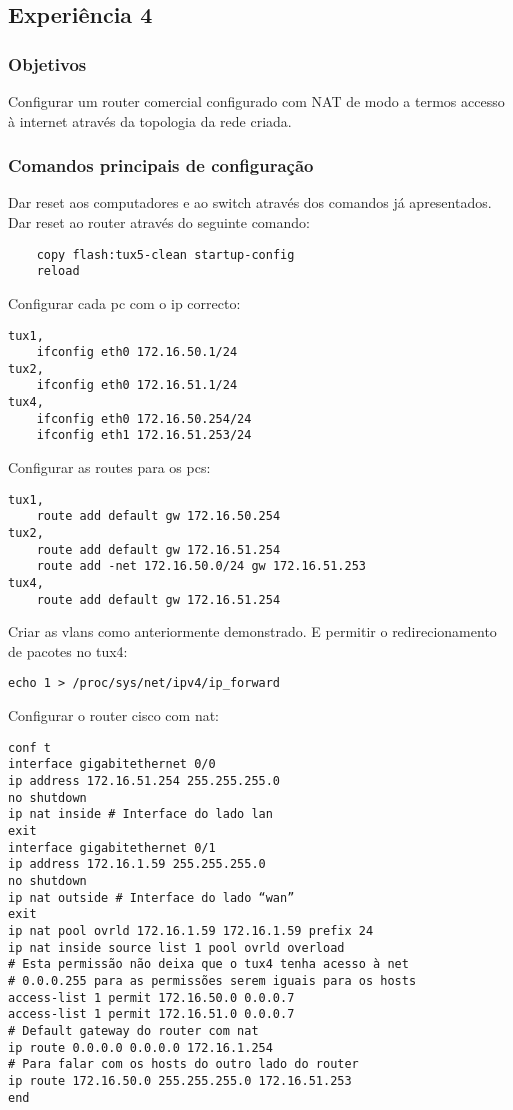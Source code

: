 \documentclass[a4paper]{article}
\begin{document}
\subsection{Experiência 4}

\subsubsection{Objetivos}
Configurar um router comercial configurado com NAT de modo a termos accesso à
internet através da topologia da rede criada.

\subsubsection{Comandos principais de configuração}

Dar reset aos computadores e ao switch através dos comandos já apresentados.\\

Dar reset ao router através do seguinte comando:
\begin{verbatim}
    copy flash:tux5-clean startup-config
    reload
\end{verbatim}

Configurar cada pc com o ip correcto:
\begin{verbatim}
tux1,
    ifconfig eth0 172.16.50.1/24
tux2,
    ifconfig eth0 172.16.51.1/24
tux4,
    ifconfig eth0 172.16.50.254/24
    ifconfig eth1 172.16.51.253/24
\end{verbatim}

Configurar as routes para os pcs:
\begin{verbatim}
tux1,
    route add default gw 172.16.50.254
tux2,
    route add default gw 172.16.51.254
    route add -net 172.16.50.0/24 gw 172.16.51.253
tux4,
    route add default gw 172.16.51.254
\end{verbatim}

Criar as vlans como anteriormente demonstrado. E permitir o redirecionamento de pacotes no tux4:
\begin{verbatim}
echo 1 > /proc/sys/net/ipv4/ip_forward
\end{verbatim}

Configurar o router cisco com nat:
\begin{verbatim}
conf t
interface gigabitethernet 0/0
ip address 172.16.51.254 255.255.255.0
no shutdown
ip nat inside # Interface do lado lan
exit
interface gigabitethernet 0/1
ip address 172.16.1.59 255.255.255.0
no shutdown
ip nat outside # Interface do lado “wan”
exit
ip nat pool ovrld 172.16.1.59 172.16.1.59 prefix 24
ip nat inside source list 1 pool ovrld overload
# Esta permissão não deixa que o tux4 tenha acesso à net
# 0.0.0.255 para as permissões serem iguais para os hosts
access-list 1 permit 172.16.50.0 0.0.0.7
access-list 1 permit 172.16.51.0 0.0.0.7
# Default gateway do router com nat
ip route 0.0.0.0 0.0.0.0 172.16.1.254
# Para falar com os hosts do outro lado do router
ip route 172.16.50.0 255.255.255.0 172.16.51.253
end
\end{verbatim}
\end{document}
